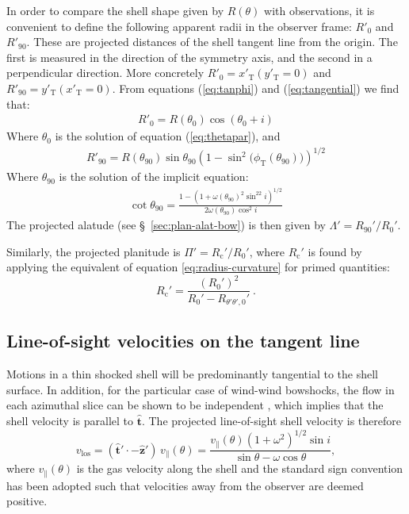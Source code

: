 \documentclass[useAMS, usenatbib, a4paper]{mnras}
\newcommand\C{\ensuremath{\mathrm{c}}}
\newcommand\uvec[1]{\bm{\hat{#1}}} %
\newcommand\T{_{\mathrm{\scriptscriptstyle T}}} %
\begin{document}
In order to compare the shell shape given by $R(\theta)$ with observations,
it is convenient to define the following apparent radii in the
observer frame: $R'_{0}$ and $R'_{90}$. These are projected distances
of the shell tangent line from the origin. The first is measured in
the direction of the symmetry axis, and the second in a perpendicular
direction. More concretely $R'_{0} = x'\T(y'\T=0)$ and
$R'_{90} = y'\T(x'\T=0)$. From equations (\ref{eq:tanphi}) and
(\ref{eq:tangential}) we find that:
\begin{align}
R'_{0} = R(\theta_{0})\cos(\theta_{0} + i) \label{eq:Rpar} 
\end{align}
Where $\theta_{0}$ is the solution of equation (\ref{eq:thetapar}), and
\begin{align}
  \label{eq:R90prime}
R'_{90} = R(\theta_{90})\sin\theta_{90}\left(1-\sin^2\bigl(\phi\T(\theta_{90})\bigr)\right)^{1/2}
\end{align}
Where $\theta_{90}$ is the solution of the implicit equation:
\begin{align}
  \label{eq:th90}
\cot\theta_{90} = \frac{1-\left(1+\omega(\theta_{90})^2\sin^22i\right)^{1/2}}{2\omega(\theta_{90})\cos^2 i}
\end{align}
The projected alatude (see \S~\ref{sec:plan-alat-bow}) is then given
by \(\Lambda' = R_{90}' / R_0'\).

Similarly, the projected planitude is \(\Pi' = R_{\C}' / R_0'\), where
\(R_{\C}'\) is found by applying the equivalent of equation
\eqref{eq:radius-curvature} for primed quantities:
\begin{equation}
  \label{eq:projected-radius-curvature}
  R_{\C}' 
  = \frac{(R_0')^2}{R_0' - R_{\theta'\theta',0}'} \ .
\end{equation}


\subsection{Line-of-sight velocities on the tangent line}
\label{sec:line-sight-veloc}
Motions in a thin shocked shell will be predominantly tangential to
the shell surface. In addition, for the particular case of wind-wind
bowshocks, the flow in each azimuthal slice can be shown to be
independent \citep{Wilkin:2000a}, which implies that the shell
velocity is parallel to \(\uvec{t}\). The projected line-of-sight
shell velocity is therefore
  \begin{equation}
    \label{eq:vlos}
    v_{\mathrm{los}} = (\uvec{t}' \cdot -\uvec{z}') \, v_{\parallel}(\theta) = \frac{v_{\parallel}(\theta) (1+\omega^2)^{1/2} \sin i }{\sin\theta - \omega\cos\theta} ,
  \end{equation}
  where \( v_{\parallel}(\theta)\) is the gas velocity along the shell and the standard sign convention has been adopted such that velocities away from the observer are deemed positive. 
\end{document}
